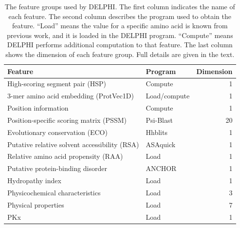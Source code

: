 \documentclass{bioinfo}
\begin{document}
\begin{methods}
\begin{table}[H]
  \centering
  \caption{The feature groups used by DELPHI. The first column indicates the name of each feature. The second column describes the program used to obtain the feature. ``Load'' means the value for a specific amino acid is known from previous work, and it is loaded in the DELPHI program. ``Compute'' means DELPHI performs additional computation to that feature. The last column shows the dimension of each feature group. Full details are given in the text.}
    \begin{tabular}{@{}ll@{}r@{}}
    \toprule
    Feature & Program & Dimension \\
    \midrule
    High-scoring segment pair (HSP) & Compute & 1 \\
    3-mer amino acid embedding (ProtVec1D) & Load/compute & 1 \\
    Position information & Compute & 1 \\
    Position-specific scoring matrix (PSSM) & Psi-Blast & 20 \\
    Evolutionary conservation (ECO) & Hhblits & 1 \\
    Putative relative solvent accessibility (RSA) & ASAquick & 1 \\
    Relative amino acid propensity (RAA) & Load  & 1 \\
    Putative protein-binding disorder & ANCHOR & 1 \\
    Hydropathy index & Load  & 1 \\
    Physicochemical characteristics & Load  & 3 \\
    Physical properties & Load  & 7 \\
    PKx   & Load  & 1 \\
    \bottomrule
    \end{tabular}%
  \label{tab_feature}%
\end{table}%


\end{methods}
\end{document}
